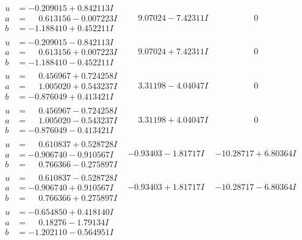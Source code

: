\documentclass[1p]{elsarticle_modified}
\theoremstyle{definition}
\begin{document}
$$\begin{array}{c|c|c}
\begin{aligned}
u &= -0.209015 + 0.842113 I \\
a &= \phantom{-}0.613156 - 0.007223 I \\
b &= -1.188410 + 0.452211 I\end{aligned}
 & \phantom{-}9.07024 - 7.42311 I & \phantom{-0.000000 } 0 \\ \hline\begin{aligned}
u &= -0.209015 - 0.842113 I \\
a &= \phantom{-}0.613156 + 0.007223 I \\
b &= -1.188410 - 0.452211 I\end{aligned}
 & \phantom{-}9.07024 + 7.42311 I & \phantom{-0.000000 } 0 \\ \hline\begin{aligned}
u &= \phantom{-}0.456967 + 0.724258 I \\
a &= \phantom{-}1.005020 + 0.543237 I \\
b &= -0.876049 + 0.413421 I\end{aligned}
 & \phantom{-}3.31198 - 4.04047 I & \phantom{-0.000000 } 0 \\ \hline\begin{aligned}
u &= \phantom{-}0.456967 - 0.724258 I \\
a &= \phantom{-}1.005020 - 0.543237 I \\
b &= -0.876049 - 0.413421 I\end{aligned}
 & \phantom{-}3.31198 + 4.04047 I & \phantom{-0.000000 } 0 \\ \hline\begin{aligned}
u &= \phantom{-}0.610837 + 0.528728 I \\
a &= -0.906740 - 0.910567 I \\
b &= \phantom{-}0.766366 - 0.275897 I\end{aligned}
 & -0.93403 - 1.81717 I & -10.28717 + 6.80364 I \\ \hline\begin{aligned}
u &= \phantom{-}0.610837 - 0.528728 I \\
a &= -0.906740 + 0.910567 I \\
b &= \phantom{-}0.766366 + 0.275897 I\end{aligned}
 & -0.93403 + 1.81717 I & -10.28717 - 6.80364 I \\ \hline\begin{aligned}
u &= -0.654850 + 0.418140 I \\
a &= \phantom{-}0.18276 - 1.79134 I \\
b &= -1.202110 - 0.564951 I\end{aligned}

\end{array}$$
\end{document}
